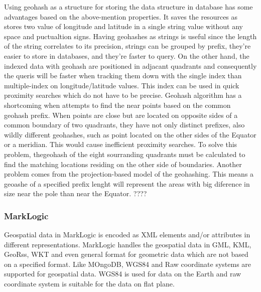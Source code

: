 \documentclass[a4paper,12pt]{article}
\begin{document}
Using geohash as a structure for storing the data structure in database has some advantages based on the above-mention properties. It saves the resources as stores two value of longitude and latitude in a single string value without any space and puctualtion signs. Having geohashes as strings is useful since the length of the string correlates to its precision, strings can be grouped by prefix, they’re easier to store in databases, and they’re faster to query. On the other hand, the indexed data with geohash are positioned in adjacant quadrants and consequently the queris will be faster when tracking them down with the single index than multiple-index on longitude/latitude values. This index can be used in quick proximity searches which do not have to be precise.
Geohash algorithm has a shortcoming when attempts to find the near points based on the common geohash prefix. When points are close but are located on opposite sides of a common boundary of two quadrants, they have not only distinct prefixes, also wildly different geohashes, such as point located on the other sides of the Equator or a meridian. This would cause inefficient proximity searches. To solve this problem, thegeohash of the eight sourranding quadrants must be calculated to find the matching locations residing on the other side of boundaries. 
Another problem comes from the projection-based model of the geohashing. This means a geoashe of a specified prefix lenght will represent the areas with big diference in size near the pole than near the Equator. ????


\subsubsection{MarkLogic}
Geospatial data in MarkLogic is encoded as XML elements and/or attributes in different representations. MarkLogic handles the geospatial data in GML, KML, GeoRss, WKT and even general format for geometric data which are not based on a specified format. Like MOngoDB, WGS84 and Raw coordinate systems are supported for geospatial data. WGS84 is used for data on the Earth and raw coordinate system is suitable for the data on flat plane.
\end{document}
